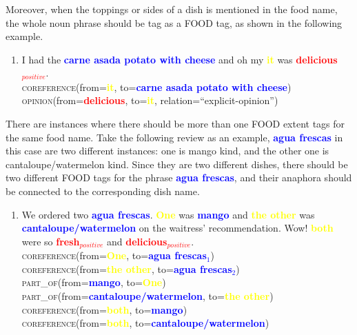 \documentclass{article}
\begin{document}
Moreover, when the toppings or sides of a dish is mentioned in the food name, the whole noun phrase should be tag as a FOOD tag, as shown in the following example.

\begin{enumerate}[resume]
	\item I had the \textbf{\textcolor{blue}{carne asada potato with cheese}} and oh my \textbf{\textcolor{yellow}{it}} was \textbf{\textcolor{red}{delicious$_{positive}$}}.\\
	\textsc{coreference}(from=\textbf{\textcolor{yellow}{it}}, to=\textbf{\textcolor{blue}{carne asada potato with cheese}})\\
		\textsc{opinion}(from=\textbf{\textcolor{red}{delicious}}, to=\textbf{\textcolor{yellow}{it}}, relation=``explicit-opinion'')\\
\end{enumerate}

There are instances where there should be more than one FOOD extent tags for the same food name. Take the following review as an example, \textbf{\textcolor{blue}{agua frescas}} in this case are two different instances: one is mango kind, and the other one is cantaloupe/watermelon kind. Since they are two different dishes, there should be two different FOOD tags for the phrase \textbf{\textcolor{blue}{agua frescas}}, and their anaphora should be connected to the corresponding dish name.

\begin{enumerate}[resume]
\item We ordered two \textbf{\textcolor{blue}{agua frescas}}. \textbf{\textcolor{yellow}{One}} was  \textbf{\textcolor{blue}{mango}} and \textbf{\textcolor{yellow}{the other}} was 
\textbf{\textcolor{blue}{cantaloupe/watermelon}} on the waitress' recommendation. Wow! 
\textbf{\textcolor{yellow}{both}} were so 
\textbf{\textcolor{red}{fresh$_{positive}$}} and 
\textbf{\textcolor{red}{delicious$_{positive}$}}.\\
\textsc{coreference}(from=\textbf{\textcolor{yellow}{One}}, to=\textbf{\textcolor{blue}{agua frescas$_{1}$}}) \\
\textsc{coreference}(from=\textbf{\textcolor{yellow}{the other}}, to=\textbf{\textcolor{blue}{agua frescas$_{2}$}}) \\
\textsc{part\_of}(from=\textbf{\textcolor{blue}{mango}}, to=\textbf{\textcolor{yellow}{One}})\\
\textsc{part\_of}(from=\textbf{\textcolor{blue}{cantaloupe/watermelon}}, to=\textbf{\textcolor{yellow}{the other}})\\
\textsc{coreference}(from=\textbf{\textcolor{yellow}{both}}, to=\textbf{\textcolor{blue}{mango}}) \\
\textsc{coreference}(from=\textbf{\textcolor{yellow}{both}}, to=\textbf{\textcolor{blue}{cantaloupe/watermelon}}) \\
\end{enumerate}
\end{document}
